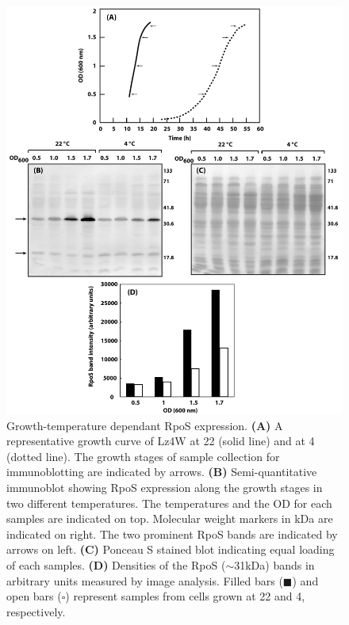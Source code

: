 \begin{figure}[tbp]
\begin{narrow}{-1in}{-0.6in}
\flushright
\includegraphics{figures/chap6_rpos_western_points_removed}
\end{narrow}
\caption[Growth-temperature dependant RpoS
expression]{Growth-temperature dependant RpoS expression.
\textbf{(A)} A representative growth curve of Lz4W at 22\dg{}
(solid line) and at 4\dg{} (dotted line). The growth stages of
sample collection for immunoblotting are indicated by arrows.
\textbf{(B)} Semi-quantitative immunoblot showing RpoS expression
along the growth stages in two different temperatures. The
temperatures and the OD for each samples are indicated on
top. Molecular weight markers in kDa are indicated on right. The
two prominent RpoS bands are indicated by arrows on left.
\textbf{(C)} Ponceau S stained blot indicating equal loading of
each samples. \textbf{(D)} Densities of the RpoS
(\U{$\sim$31}{kDa}) bands in arbitrary units measured by image
analysis. Filled bars ($\blacksquare$) and open bars ($\square$)
represent samples from cells grown at 22\dg{} and 4\dg{},
respectively.} \label{chap6_rpos_western}
\end{figure}

